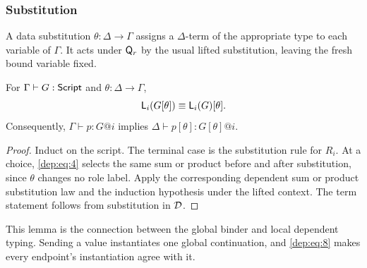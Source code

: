 \subsubsection{Substitution}

A data substitution $\theta:\Delta\to\Gamma$ assigns a $\Delta$-term of the
appropriate type to each variable of $\Gamma$. It acts under $\mathsf Q_r$ by the
usual lifted substitution, leaving the fresh bound variable fixed.

\begin{lemma}
\label{lem:substitution}
For $\Gamma\vdash G:\mathsf{Script}$ and $\theta:\Delta\to\Gamma$,
\begin{equation}
 \mathsf L_{i}(G[\theta])\mathrel{\equiv}\mathsf L_{i}(G)[\theta].
 \label{dep:eq:8}
\end{equation}
Consequently, $\Gamma\vdash p:G@i$ implies
$\Delta\vdash p[\theta]:G[\theta]@i$.
\end{lemma}
\begin{proof}
Induct on the script. The terminal case is the substitution rule for $R_i$.
At a choice, \eqref{dep:eq:4} selects the same sum or product before and after
substitution, since $\theta$ changes no role label. Apply the corresponding
dependent sum or product substitution law and the induction hypothesis under
the lifted context. The term statement follows from substitution in $\mathcal D$.
\end{proof}

This lemma is the connection between the global binder and local dependent
typing. Sending a value instantiates one global continuation, and \eqref{dep:eq:8} makes
every endpoint's instantiation agree with it.
